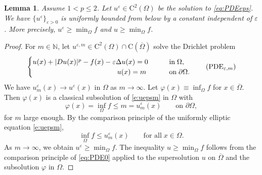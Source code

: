 \documentclass[12pt,reqno]{amsart}
\numberwithin{figure}{section}
\theoremstyle{plain}
\newtheorem{lem}[thm]{Lemma}
\theoremstyle{remark}
\numberwithin{equation}{section}
\newcommand{\rmC}{\mathrm{C}}
\begin{document}
\begin{lem}\label{lem:lower-bound} Assume $1<p\leq 2$. Let $u^\varepsilon\in \mathrm{C}^2(\Omega)$ be the solution to \eqref{eq:PDEeps}. We have $\{  u^\varepsilon\}_{\varepsilon>0}$ is uniformly bounded from below by a constant independent of $\varepsilon$. More precisely, $  u^\varepsilon \geq \min_\Omega f$ and $  u\geq \min_\Omega f$.
\end{lem}
\begin{proof} For $m\in \mathbb{N}$, let $u^{\varepsilon,m}\in \mathrm{C}^2(\Omega)\cap \rmC(\overline{\Omega})$ solve the Drichlet problem
\begin{equation}\label{e:uepsm}
    \begin{cases}
      u(x) + |Du(x)|^p - f(x) - \varepsilon \Delta u(x) = 0 &\qquad
    \text{in}\;\Omega, \vspace{0cm}\\
    \quad \qquad\quad\qquad\qquad\qquad\qquad u(x) = m &\qquad
    \text{on}\;\partial\Omega.
    \end{cases} \tag{PDE$_{\varepsilon,m}$}
\end{equation}
We have $u^{\varepsilon}_m(x) \to u^\varepsilon(x)$ in $\Omega$ as $m\to \infty$. Let $\varphi(x) \equiv  \inf_{\Omega} f$ for $x\in \overline{\Omega}$. Then $\varphi(x)$ is a classical subsolution of \eqref{e:uepsm} in $\Omega$ with
\begin{equation*}
    \varphi(x) =   \inf_\Omega f \leq m = u^\varepsilon_m(x) \qquad \text{on } \partial \Omega,
\end{equation*}
for $m$ large enough.
By the comparison principle of the uniformly elliptic equation \eqref{e:uepsm},
\begin{equation*}
     \inf_\Omega f \leq u^{\varepsilon}_m(x) \qquad\text{for all}\;x\in \Omega.
\end{equation*}
As $m\to \infty$, we obtain $  u^\varepsilon \geq \min_\Omega f$. The inequality $  u\geq \min_{\Omega}f$ follows from the comparison principle of \eqref{eq:PDE0} applied to the supersolution $u$ on $\overline{\Omega}$ and the subsolution $\varphi$ in $\Omega$.
\end{proof}
\end{document}
